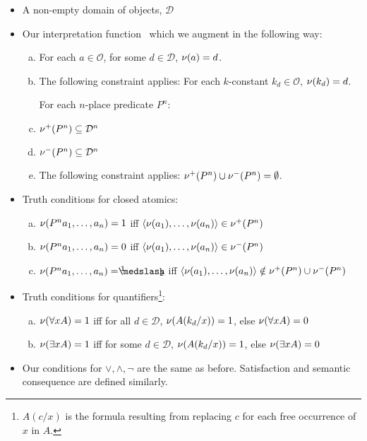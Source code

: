 \begin{singlespace}
\begin{itemize}
\item A non-empty domain of objects, $\mathcal{D}$
\item Our interpretation function \MCnu\, which we augment in the following way:
\begin{enumerate}[(a)]
\item For each $a\in\mathcal{O}$, for some $d\in\mathcal{D}$, $\mathcal{\nu}(a)=d$.
\item The following constraint applies: For each $k$-constant $k_d\in\mathcal{O}$, $\mathcal{\nu}(k_d)=d$.

\bigskip

For each $n$-place predicate $P^n$:
\item $\mathcal{\nu}^+(P^n)\subseteq\mathcal{D}^n$
\item $\mathcal{\nu}^-(P^n)\subseteq\mathcal{D}^n$
\item The following constraint applies: $\mathcal{\nu}^+(P^n)\cup\mathcal{\nu}^-(P^n)=\emptyset$.
\end{enumerate}

\item Truth conditions for closed atomics:

\begin{enumerate}[(a)]
\item $\mathcal{\nu}(P^na_1,\dots,a_n)=1$ iff $\langle\mathcal{\nu}(a_1),\dots,\mathcal{\nu}(a_n)\rangle\in\mathcal{\nu}^+(P^n)$
\item $\mathcal{\nu}(P^na_1,\dots,a_n)=0$ iff $\langle\mathcal{\nu}(a_1),\dots,\mathcal{\nu}(a_n)\rangle\in\mathcal{\nu}^-(P^n)$
\item $\MCnu(P^na_1,\dots,a_n)=\oneHalf$ iff $\langle\mathcal{\nu}(a_1),\dots,\mathcal{\nu}(a_n)\rangle\notin\mathcal{\nu}^+(P^n)\cup\mathcal{\nu}^-(P^n)$
\end{enumerate}

\item Truth conditions for quantifiers\footnote{$A(c/x)$ is the formula resulting from replacing $c$ for each free occurrence of $x$ in $A$.}:

\begin{enumerate}[(a)]
\item $\mathcal{\nu}(\forall xA)=1$ iff for all $d\in\mathcal{D}$, $\mathcal{\nu}(A(k_d/x))=1$, else $\mathcal{\nu}(\forall xA)=0$
\item $\mathcal{\nu}(\exists xA)=1$ iff for some $d\in\mathcal{D}$, $\mathcal{\nu}(A(k_d/x))=1$, else $\mathcal{\nu}(\exists xA)=0$
\end{enumerate}

\item Our conditions for $\vee, \wedge, \neg$ are the same as before. Satisfaction and semantic consequence are defined similarly.

\end{itemize}
\end{singlespace}

